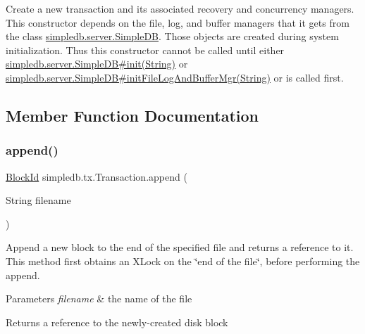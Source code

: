 Create a new transaction and its associated recovery and concurrency managers. This constructor depends on the file, log, and buffer managers that it gets from the class \hyperlink{classsimpledb_1_1server_1_1SimpleDB}{simpledb.\+server.\+Simple\+DB}. Those objects are created during system initialization. Thus this constructor cannot be called until either \hyperlink{}{simpledb.\+server.\+Simple\+D\+B\#init(\+String)} or \hyperlink{}{simpledb.\+server.\+Simple\+D\+B\#init\+File\+Log\+And\+Buffer\+Mgr(\+String)} or is called first. 

\subsection{Member Function Documentation}
\mbox{\label{classsimpledb_1_1tx_1_1Transaction_a88d23a92c71f7c637963a2ee5c429ee8}} 
\subsubsection{\texorpdfstring{append()}{append()}}
{\footnotesize\ttfamily \hyperlink{classsimpledb_1_1file_1_1BlockId}{Block\+Id} simpledb.\+tx.\+Transaction.\+append (\begin{DoxyParamCaption}\item[{String}]{filename }\end{DoxyParamCaption})\hspace{0.3cm}{\ttfamily [inline]}}

Append a new block to the end of the specified file and returns a reference to it. This method first obtains an X\+Lock on the \char`\"{}end of the file\char`\"{}, before performing the append. 
\begin{DoxyParams}{Parameters}
{\em filename} & the name of the file \\
\hline
\end{DoxyParams}
\begin{DoxyReturn}{Returns}
a reference to the newly-\/created disk block 
\end{DoxyReturn}
\mbox{\label{classsimpledb_1_1tx_1_1Transaction_a853d9a4e2979555d80806793fb1f83fb}} 

